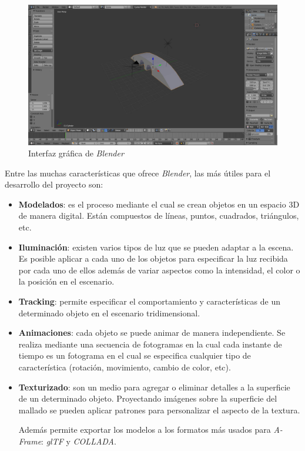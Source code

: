     
\begin{figure}[H]
    \centering
    \includegraphics[width=1\textwidth]{img/blender.jpg}
    \caption{Interfaz gráfica de \textit{Blender}} 
    \label{fig:blender}
\end{figure}

Entre las muchas características que ofrece \textit{Blender}, las más útiles para el desarrollo del proyecto son:
\begin{itemize}
    \item \textbf{Modelados}: es el proceso mediante el cual se crean objetos en un espacio 3D de manera digital. Están compuestos de líneas, puntos, cuadrados, triángulos, etc. 
    
    \item \textbf{Iluminación}: existen varios tipos de luz que se pueden adaptar a la escena. Es posible aplicar a cada uno de los objetos para especificar la luz recibida por cada uno de ellos además de variar aspectos como la intensidad, el color o la posición en el escenario.
    
    \item \textbf{Tracking}: permite especificar el comportamiento y características de un determinado objeto en el escenario tridimensional. 
    
    \item \textbf{Animaciones}: cada objeto se puede animar de manera independiente. Se realiza mediante una secuencia de fotogramas en la cual cada instante de tiempo es un fotograma en el cual se especifica cualquier tipo de característica (rotación, movimiento, cambio de color, etc).  
    
    \item \textbf{Texturizado}: son un medio para agregar o eliminar detalles a la superficie de un determinado objeto. Proyectando imágenes sobre la superficie del mallado se pueden aplicar patrones para personalizar el aspecto de la textura. 

    Además permite exportar los modelos a los formatos más usados para \textit{A-Frame}: \textit{glTF} y \textit{COLLADA}. 
\end{itemize}
